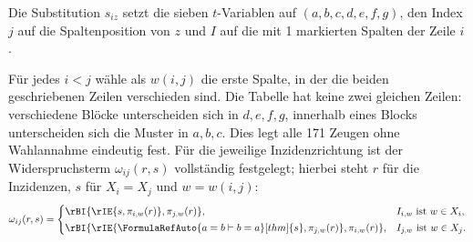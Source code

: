 Die Substitution \(s_{iz}\) setzt die sieben \(t\)-Variablen auf
\((a,b,c,d,e,f,g)\), den Index \(j\) auf die Spaltenposition von
\(z\) und \(I\) auf die mit 1 markierten Spalten der Zeile \(i\).
\begin{tabproofwide}
  \proofstepwidestar[1]{\FTData}{\rA}
\end{tabproofwide}

Für jedes \(i<j\) wähle als \(w(i,j)\) die erste Spalte, in der die
beiden geschriebenen Zeilen verschieden sind. Die Tabelle hat keine
zwei gleichen Zeilen: verschiedene Blöcke unterscheiden sich in
\(d,e,f,g\), innerhalb eines Blocks unterscheiden sich die Muster in
\(a,b,c\). Dies legt alle 171 Zeugen ohne Wahlannahme eindeutig fest.
Für die jeweilige Inzidenzrichtung ist der Widerspruchsterm
\(\omega_{ij}(r,s)\) vollständig festgelegt; hierbei steht \(r\)
für die Inzidenzen, \(s\) für \(X_i=X_j\) und \(w=w(i,j)\):
\[
\omega_{ij}(r,s)=
\begin{cases}
 \rBI{\rIE{s,\pi_{i,w}(r)},\pi_{j,w}(r)},&I_{i,w}\text{ ist }w\in X_i,\\[2pt]
 \rBI{\rIE{\FormulaRefAuto{a=b\vdash b=a}[thm]{s},\pi_{j,w}(r)},
       \pi_{i,w}(r)},&I_{j,w}\text{ ist }w\in X_j.
\end{cases}
\]
\begin{tabproofwide}
  \proofstepwidestar[1]{\FTData}{\rA}
\end{tabproofwide}

